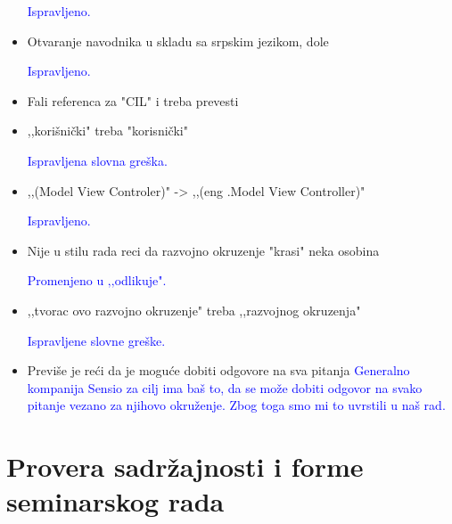 \documentclass[a4paper]{report}
\newcommand{\odgovor}[1]{\textcolor{blue}{#1}}
\begin{document}
\begin{itemize}
\odgovor{Ispravljeno.}

\item Otvaranje navodnika u skladu sa srpskim jezikom, dole

\odgovor{Ispravljeno.}

\item Fali referenca za "CIL" i treba prevesti

\item ,,korišnički" treba "korisnički"

\odgovor{Ispravljena slovna greška.}

\item ,,(Model View Controler)" -> ,,(eng .Model View Controller)"

\odgovor{Ispravljeno.}

\item Nije u stilu rada reci da razvojno okruzenje "krasi" neka osobina

\odgovor{Promenjeno u ‚‚odlikuje".}

\item ,,tvorac ovo razvojno okruzenje" treba ,,razvojnog okruzenja"

\odgovor{Ispravljene slovne greške.}

\item Previše je reći da je moguće dobiti odgovore na sva pitanja
\odgovor{Generalno kompanija Sensio za cilj ima baš to, da se može dobiti odgovor na svako pitanje vezano za njihovo okruženje.
Zbog toga smo mi to uvrstili u naš rad.}

\end{itemize}


\section{Provera sadržajnosti i forme seminarskog rada}
\end{document}

